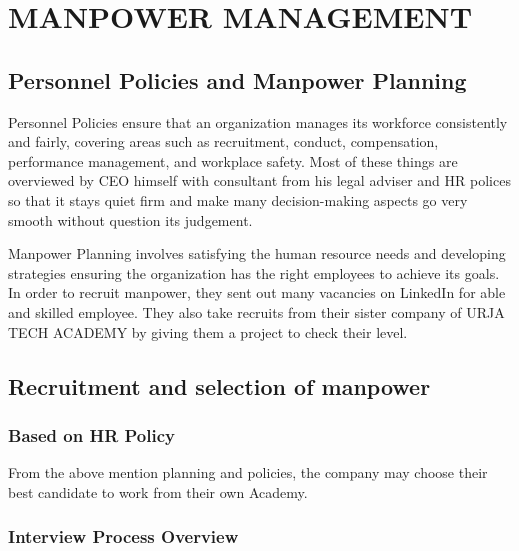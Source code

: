 
\chapter{MANPOWER MANAGEMENT}

\section{Personnel Policies and  Manpower Planning}
Personnel Policies ensure that an organization manages its workforce consistently and fairly, covering areas such as recruitment, conduct, compensation, performance management, and workplace safety. Most of these things are overviewed by CEO himself with consultant from his legal adviser and HR polices so that it stays quiet firm and make many decision-making aspects go very smooth without question its judgement.

Manpower Planning involves satisfying the human resource needs and developing strategies ensuring the organization has the right employees to achieve its goals. In order to recruit manpower, they sent out many vacancies on LinkedIn for able and skilled employee. They also take recruits from their sister company of URJA TECH ACADEMY by giving them a project to check their level. 

\section{Recruitment and selection of manpower}
\subsection{Based on HR Policy}

From the above mention planning and policies, the company may choose their best candidate to work from their own Academy.

\subsection{Interview Process Overview}

